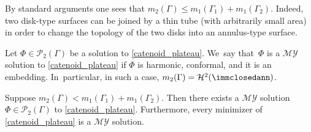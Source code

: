 By standard arguments one sees that $m_2(\Gamma)\le m_1(\Gamma_1)+m_1(\Gamma_2)$. Indeed, two disk-type surfaces can be joined by a thin tube (with arbitrarily small area) in order to change the topology of the two disks into an annulus-type surface.

\begin{definition}\label{def:MY_solution}
Let $\Phi\in\mathcal{P}_2(\Gamma)$ be a solution to \eqref{catenoid_plateau}. We~say that~$\Phi$ is a $\mathcal{MY}$ solution to \eqref{catenoid_plateau} if
$\Phi$ is harmonic, conformal, and it is an embedding. In~particular, in such a case, $m_2(\Gamma)=\mathcal{H}^2(\immclosedann)$.
\end{definition}
\begin{theorem}\label{myexistence}
Suppose $m_2(\Gamma)<m_1(\Gamma_1)+m_1(\Gamma_2)$. Then there exists a $\mathcal{MY}$ solution $\Phi\in\mathcal{P}_2(\Gamma)$ to \eqref{catenoid_plateau}. Furthermore, every minimizer of \eqref{catenoid_plateau} is a $\mathcal{MY}$ solution.
\end{theorem}

